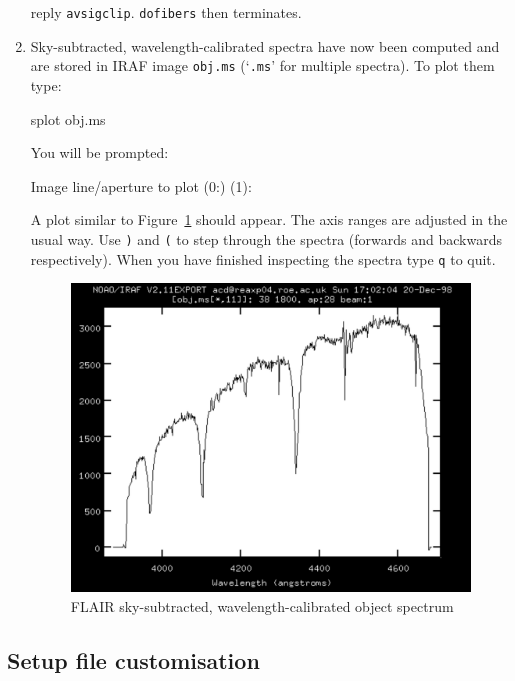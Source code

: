 \documentclass[twoside,11pt]{starlink}
\begin{document}
\begin{enumerate}
   reply \texttt{avsigclip}.  \texttt{dofibers} then terminates.

  \item Sky-subtracted, wavelength-calibrated spectra have now been
   computed and are stored in IRAF image \texttt{obj.ms} (`\texttt{.ms}' for
   multiple spectra).  To plot them type:

\begin{terminalv}
splot  obj.ms
\end{terminalv}

   You will be prompted:

\begin{terminalv}
Image line/aperture to plot (0:) (1):
\end{terminalv}

   A plot similar to Figure~\ref{FLAIR_OBJECT} should appear.
   The axis ranges are adjusted in the usual way.  Use \texttt{)} and
   \texttt{(} to step through the spectra (forwards and backwards
   respectively).  When you have finished inspecting the spectra type
   \texttt{q} to quit.

  \begin{figure}[htbp]
     \centering
     \includegraphics[totalheight=4in]{sc14_flair_object}
     \caption{FLAIR sky-subtracted, wavelength-calibrated object
      spectrum
     \label{FLAIR_OBJECT} }
  \end{figure}

\end{enumerate}

\subsection{\label{FLAIR_SETUP}Setup file customisation}
\end{document}
